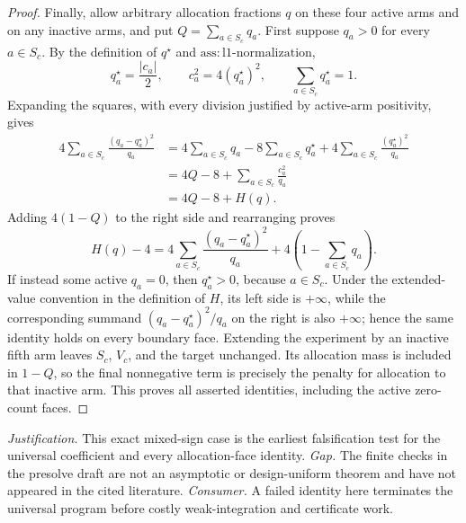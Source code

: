 \documentclass{article}
\begin{document}
\begin{proof}
Finally, allow arbitrary allocation fractions \(q\) on these four active arms and on any inactive arms, and put \(Q=\sum_{a\in S_c}q_a\).  First suppose \(q_a>0\) for every \(a\in S_c\).  By the definition of \(q^\star\) and \(\mathrm{ass:l1\text{-}normalization}\),
\[
 q_a^\star=\frac{|c_a|}{2},\qquad
 c_a^2=4(q_a^\star)^2,
 \qquad
 \sum_{a\in S_c}q_a^\star=1.
\]
Expanding the squares, with every division justified by active-arm positivity, gives
\[
\begin{aligned}
4\sum_{a\in S_c}\frac{(q_a-q_a^\star)^2}{q_a}
&=4\sum_{a\in S_c}q_a
  -8\sum_{a\in S_c}q_a^\star
  +4\sum_{a\in S_c}\frac{(q_a^\star)^2}{q_a}\\
&=4Q-8+\sum_{a\in S_c}\frac{c_a^2}{q_a}\\
&=4Q-8+H(q).
\end{aligned}
\]
Adding \(4(1-Q)\) to the right side and rearranging proves
\[
 H(q)-4
 =4\sum_{a\in S_c}\frac{(q_a-q_a^\star)^2}{q_a}
  +4\left(1-\sum_{a\in S_c}q_a\right).
\]
If instead some active \(q_a=0\), then \(q_a^\star>0\), because \(a\in S_c\).  Under the extended-value convention in the definition of \(H\), its left side is \(+\infty\), while the corresponding summand \((q_a-q_a^\star)^2/q_a\) on the right is also \(+\infty\); hence the same identity holds on every boundary face.  Extending the experiment by an inactive fifth arm leaves \(S_c\), \(V_c\), and the target unchanged.  Its allocation mass is included in \(1-Q\), so the final nonnegative term is precisely the penalty for allocation to that inactive arm.  This proves all asserted identities, including the active zero-count faces.
\end{proof}
\par\smallskip\noindent \textit{Justification.} This exact mixed-sign case is the earliest falsification test for the universal coefficient and every allocation-face identity. \textit{Gap.} The finite checks in the presolve draft are not an asymptotic or design-uniform theorem and have not appeared in the cited literature. \textit{Consumer.} A failed identity here terminates the universal program before costly weak-integration and certificate work.
\end{document}
